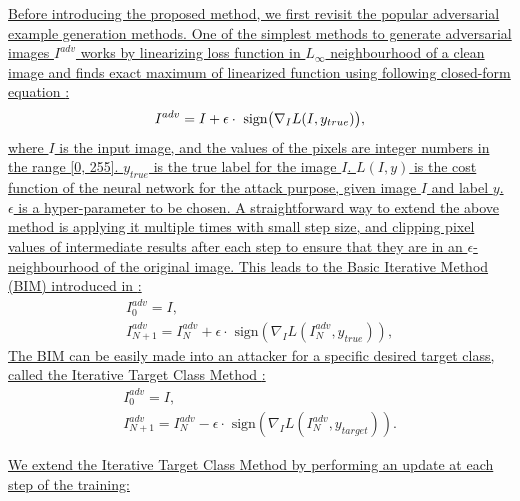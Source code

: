 \documentclass[12pt]{article}
\begin{document}
\uline{Before introducing the proposed method, we first revisit the popular adversarial example generation methods. One of the simplest methods to generate adversarial images $I^{adv}$ works by linearizing loss function in $L_{\infty}$ neighbourhood of a clean image and finds exact maximum of linearized function using following closed-form equation \cite{FGSM}:}
\begin{equation}
    I^{adv} = I + \epsilon \cdot \text{ sign} \bigl( \nabla_I L(I, y_{true})  \bigr),
    \vspace{-0.1cm}
\end{equation}
\uline{where $I$ is the input image, and the values of the pixels are integer numbers in the range [0, 255]. $y_{true}$ is the true label for the image $I$. $L(I, y)$ is the cost function of the neural network for the attack purpose, given image $I$ and label $y$. $\epsilon$ is a hyper-parameter to be chosen. A straightforward way to extend the above method is applying it multiple times with small step size, and clipping pixel values of intermediate results after each step to ensure that they are in an $\epsilon$-neighbourhood of the original image.  This leads to the Basic Iterative Method (BIM) introduced in \cite{kurakin2017adversarial}:}
\begin{equation}
    \begin{gathered}
        I_0^{adv} = I, \\
        I_{N+1}^{adv} = I_N^{adv}+\epsilon \cdot \text{ sign}(\nabla_I L(I_N^{adv},y_{true})),
    \end{gathered}
\end{equation}
\uline{The BIM can be easily made into an attacker for a specific desired target class, called the Iterative Target Class Method \cite{kurakin2017adversarial}:}
\begin{equation}
  \begin{gathered}
      I_0^{adv} = I,\\
      I_{N+1}^{adv} = I_N^{adv}-\epsilon \cdot \text{ sign}(\nabla_I L(I_N^{adv},y_{target})).
  \end{gathered}
  \label{equ:itcm}
\end{equation}

\uline{We extend the Iterative Target Class Method by performing an update at each step of the training:}
\end{document}
